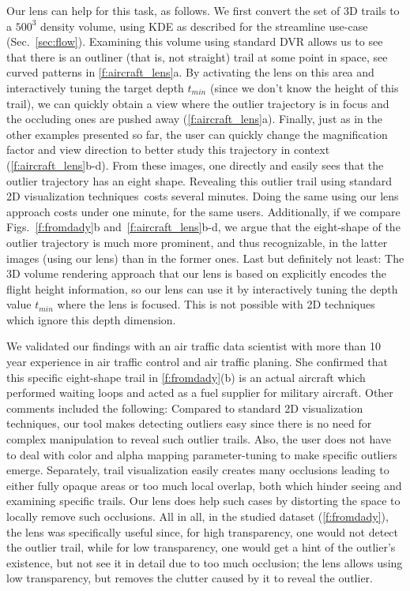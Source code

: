 Our lens can help for this task, as follows. We first convert the set of 3D trails to a $500^3$ density volume, using KDE as described for the streamline use-case (Sec.~\ref{sec:flow}). Examining this volume using standard DVR allows us to see that there is an outliner (that is, not straight) trail at some point in space, see curved patterns in \autoref{f:aircraft_lens}a. By activating the lens on this area and interactively tuning the target depth $t_{min}$ (since we don't know the height of this trail), we can quickly obtain a view where the outlier trajectory is in focus and the occluding ones are pushed away (\autoref{f:aircraft_lens}a). Finally, just as in the other examples presented so far, the user can quickly change the magnification factor and view direction to better study this trajectory in context (\autoref{f:aircraft_lens}b-d). From these images, one directly and easily sees that the outlier trajectory has an eight shape. Revealing this outlier trail using standard 2D visualization techniques\,\cite{hurter2009fromdady} costs several minutes. Doing the same using our lens approach costs under one minute, for the same users. Additionally, if we compare Figs.~\ref{f:fromdady}b and~\ref{f:aircraft_lens}b-d, we argue that the eight-shape of the outlier trajectory is much more prominent, and thus recognizable, in the latter images (using our lens) than in the former ones. Last but definitely not least: The 3D volume rendering approach that our lens is based on explicitly encodes the flight height information, so our lens can use it by interactively tuning the depth value $t_{min}$ where the lens is focused. This is not possible with 2D techniques which ignore this depth dimension.

We validated our findings with an air traffic data scientist with more than 10 year experience in air traffic control and air traffic planing. She confirmed that this specific eight-shape trail in \autoref{f:fromdady}(b) is an actual aircraft which performed waiting loops and acted as a fuel supplier for military aircraft. Other comments included the following: Compared to standard 2D visualization techniques, our tool makes detecting outliers easy since there is no need for complex manipulation to reveal such outlier trails. Also, the user does not have to deal with color and alpha mapping parameter-tuning to make specific outliers emerge. Separately, trail visualization easily creates many occlusions leading to either fully opaque areas or too much local overlap, both which hinder seeing and examining specific trails. Our lens does help such cases by distorting the space to locally remove such occlusions. All in all, in the studied dataset (\autoref{f:fromdady}), the lens was specifically useful since, for high transparency, one would not detect the outlier trail, while for low transparency, one would get a hint of the outlier's existence, but not see it in detail due to too much occlusion; the lens allows using low transparency, but removes the clutter caused by it to reveal the outlier.


